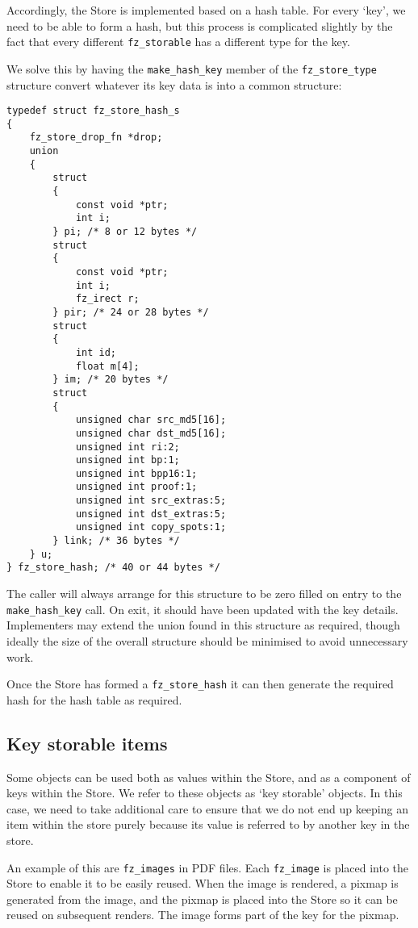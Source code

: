 \documentclass[oneside]{book}
\begin{document}
Accordingly, the Store is implemented based on a hash table. For every `key', we need to be able to form a hash, but this process is complicated slightly by the fact that every different \texttt{fz\_storable} has a different type for the key.

We solve this by having the \texttt{make\_hash\_key} member of the \texttt{fz\_store\_type} structure convert whatever its key data is into a common structure:

\begin{lstlisting}
typedef struct fz_store_hash_s
{
	fz_store_drop_fn *drop;
	union
	{
		struct
		{
			const void *ptr;
			int i;
		} pi; /* 8 or 12 bytes */
		struct
		{
			const void *ptr;
			int i;
			fz_irect r;
		} pir; /* 24 or 28 bytes */
		struct
		{
			int id;
			float m[4];
		} im; /* 20 bytes */
		struct
		{
			unsigned char src_md5[16];
			unsigned char dst_md5[16];
			unsigned int ri:2;
			unsigned int bp:1;
			unsigned int bpp16:1;
			unsigned int proof:1;
			unsigned int src_extras:5;
			unsigned int dst_extras:5;
			unsigned int copy_spots:1;
		} link; /* 36 bytes */
	} u;
} fz_store_hash; /* 40 or 44 bytes */
\end{lstlisting}

The caller will always arrange for this structure to be zero filled on entry to the \texttt{make\_hash\_key} call. On exit, it should have been updated with the key details. Implementers may extend the union found in this structure as required, though ideally the size of the overall structure should be minimised to avoid unnecessary work.

Once the Store has formed a \texttt{fz\_store\_hash} it can then generate the required hash for the hash table as required.

\subsection{Key storable items}

Some objects can be used both as values within the Store, and as a component of keys within the Store. We refer to these objects as `key storable' objects. In this case, we need to take additional care to ensure that we do not end up keeping an item within the store purely because its value is referred to by another key in the store.

An example of this are \texttt{fz\_images} in PDF files. Each \texttt{fz\_image} is placed into the Store to enable it to be easily reused. When the image is rendered, a pixmap is generated from the image, and the pixmap is placed into the Store so it can be reused on subsequent renders. The image forms part of the key for the pixmap.
\end{document}
